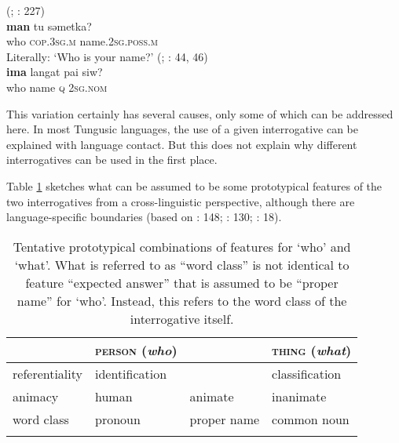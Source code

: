 \documentclass[output=paper,colorlinks,citecolor=brown]{langscibook}
\begin{document}
\ea
    \label{example4.24}
     (; \citealt{Elias2014}: 227)\\
    \gll \textbf{man}	tu			səmetka?\\
    who		\textsc{cop.3sg.m}	name.2\textsc{sg.poss.m}\\
    \glt Literally: ‘Who is your name?’
\ex
    \label{example4.25}
     (; \citealt{LiTsuchida2001}: 44, 46)\\
    \gll \textbf{ima}		langat	pai		siw?\\
    who		name	\textsc{q}		2\textsc{sg.nom}\\
    \z

This variation certainly has several causes, only some of which can be addressed here. In most Tungusic languages, the use of a given interrogative can be explained with language contact. But this does not explain why different interrogatives can be used in the first place.

Table \ref{table:4.2} sketches what can be assumed to be some prototypical features of the two interrogatives from a cross-linguistic perspective, although there are language-specific boundaries (based on \citealt{Nau1999}: 148; \citealt{Croft2003}: 130; \citealt{Idiatov2007}: 18).\largerpage

\begin{table}
\begin{tabular}{ l l l l }
  \lsptoprule
        &   \textsc{person} (\textit{who})   &               &		\textsc{thing} (\textit{what})\\
  \midrule
referentiality  &	identification  &               &		classification\\
animacy         &	human           &	animate     &	    inanimate\\
word class      &   pronoun         &   proper name	&       common noun\\
  \lspbottomrule
\end{tabular}
\caption{Tentative prototypical combinations of features for ‘who’ and ‘what’. What is referred to as “word class” is not identical to  feature “expected answer” that is assumed to be “proper name” for ‘who’. Instead, this refers to the word class of the interrogative itself.}
\label{table:4.2}
\end{table}
\end{document}
